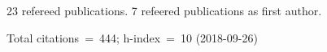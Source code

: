 23 refereed publications. 7 refeered publications as first author.

               Total citations~=~444; h-index~=~10 (2018-09-26)